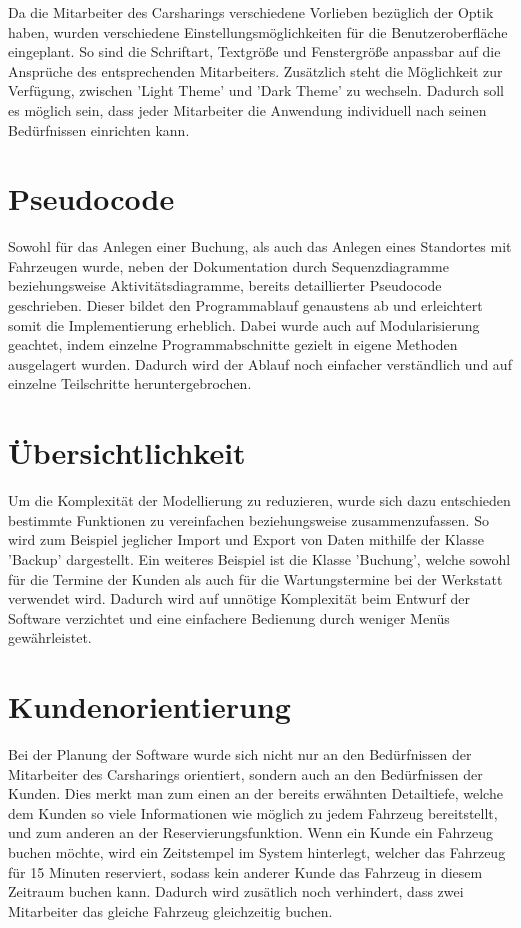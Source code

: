 Da die Mitarbeiter des Carsharings verschiedene Vorlieben bezüglich der Optik haben, wurden verschiedene Einstellungsmöglichkeiten für die Benutzeroberfläche eingeplant. So sind die Schriftart, Textgröße und Fenstergröße anpassbar auf die Ansprüche des entsprechenden Mitarbeiters. Zusätzlich steht die Möglichkeit zur Verfügung, zwischen 'Light Theme' und 'Dark Theme' zu wechseln. Dadurch soll es möglich sein, dass jeder Mitarbeiter die Anwendung individuell nach seinen Bedürfnissen einrichten kann.

\section{Pseudocode}
Sowohl für das Anlegen einer Buchung, als auch das Anlegen eines Standortes mit Fahrzeugen wurde, neben der Dokumentation durch Sequenzdiagramme beziehungsweise Aktivitätsdiagramme, bereits detaillierter Pseudocode geschrieben. Dieser bildet den Programmablauf genaustens ab und erleichtert somit die Implementierung erheblich. Dabei wurde auch auf Modularisierung geachtet, indem einzelne Programmabschnitte gezielt in eigene Methoden ausgelagert wurden. Dadurch wird der Ablauf noch einfacher verständlich und auf einzelne Teilschritte heruntergebrochen.

\section{Übersichtlichkeit}
Um die Komplexität der Modellierung zu reduzieren, wurde sich dazu entschieden bestimmte Funktionen zu vereinfachen beziehungsweise zusammenzufassen. So wird zum Beispiel jeglicher Import und Export von Daten mithilfe der Klasse 'Backup' dargestellt. Ein weiteres Beispiel ist die Klasse 'Buchung', welche sowohl für die Termine der Kunden als auch für die Wartungstermine bei der Werkstatt verwendet wird. Dadurch wird auf unnötige Komplexität beim Entwurf der Software verzichtet und eine einfachere Bedienung durch weniger Menüs gewährleistet.

\newpage

\section{Kundenorientierung}
Bei der Planung der Software wurde sich nicht nur an den Bedürfnissen der Mitarbeiter des Carsharings orientiert, sondern auch an den Bedürfnissen der Kunden. Dies merkt man zum einen an der bereits erwähnten Detailtiefe, welche dem Kunden so viele Informationen wie möglich zu jedem Fahrzeug bereitstellt, und zum anderen an der Reservierungsfunktion. Wenn ein Kunde ein Fahrzeug buchen möchte, wird ein Zeitstempel im System hinterlegt, welcher das Fahrzeug für 15 Minuten reserviert, sodass kein anderer Kunde das Fahrzeug in diesem Zeitraum buchen kann. Dadurch wird zusätlich noch verhindert, dass zwei Mitarbeiter das gleiche Fahrzeug gleichzeitig buchen.  
